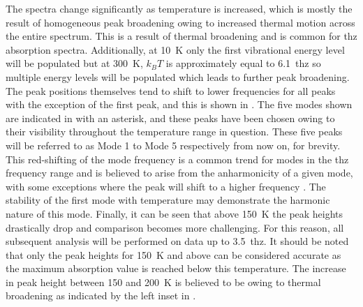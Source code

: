The spectra change significantly as temperature is increased, which is mostly the result of homogeneous peak broadening owing to increased thermal motion across the entire spectrum. This is a result of thermal broadening and is common for \acrshort{thz} absorption spectra. Additionally, at \SI{10}{K} only the first vibrational energy level will be populated but at \SI{300}{K}, \(k_BT\) is approximately equal to \SI{6.1}{\acrshort{thz}} so multiple energy levels will be populated which leads to further peak broadening. The peak positions themselves tend to shift to lower frequencies for all peaks with the exception of the first peak, and this is shown in . The five modes shown are indicated in  with an asterisk, and these peaks have been chosen owing to their visibility throughout the temperature range in question. These five peaks will be referred to as Mode 1 to Mode 5 respectively from now on, for brevity. This red\nobreakdash-shifting of the mode frequency is a common trend for modes in the \acrshort{thz} frequency range \cite{Allen2021} and is believed to arise from the anharmonicity of a given mode, with some exceptions where the peak will shift to a higher frequency \cite{Walther2003}. The stability of the first mode with temperature may demonstrate the harmonic nature of this mode. Finally, it can be seen that above \SI{150}{K} the peak heights drastically drop and comparison becomes more challenging. For this reason, all subsequent analysis will be performed on data up to \SI{3.5}{\acrshort{thz}}. It should be noted that only the peak heights for \SI{150}{K} and above can be considered accurate as the maximum absorption value is reached below this temperature. The increase in peak height between 150 and \SI{200}{K} is believed to be owing to thermal broadening as indicated by the left inset in .


